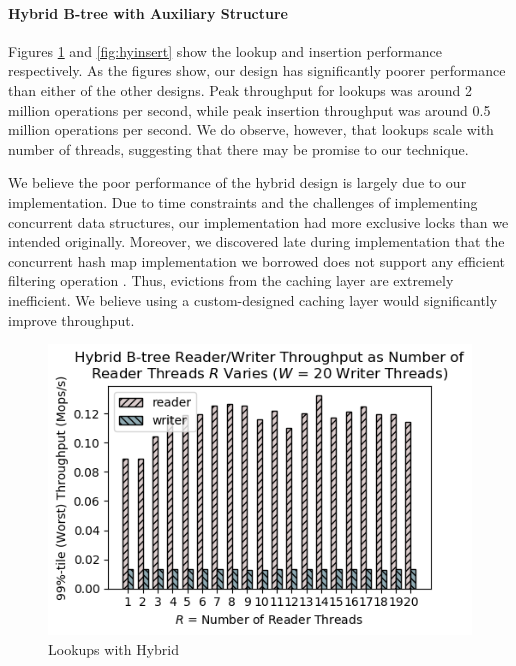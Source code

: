 \documentclass[twocolumn]{article}
\begin{document}
\paragraph{Hybrid B-tree with Auxiliary Structure}

Figures \ref{fig:hylookup} and \ref{fig:hyinsert} show the lookup and insertion
performance respectively. As the figures show, our design has significantly
poorer performance than either of the other designs. Peak throughput for
lookups was around 2 million operations per second, while peak insertion
throughput was around 0.5 million operations per second. We do observe,
however, that lookups scale with number of threads, suggesting that there may
be promise to our technique.

We believe the poor performance of the hybrid design is largely due to our
implementation. Due to time constraints and the challenges of implementing
concurrent data structures, our implementation had more exclusive locks than we
intended originally. Moreover, we discovered late during implementation that
the concurrent hash map implementation we borrowed does not support any
efficient filtering operation \cite{cuckoo}. Thus, evictions from the caching layer are
extremely inefficient. We believe using a custom-designed caching layer would
significantly improve throughput.

\begin{figure}[ht]
    \centering \includegraphics[width=\columnwidth]{figures/hybrid_w20_r1-20_99.png}
    \caption{Lookups with Hybrid \label{fig:hylookup}}
\end{figure}
\end{document}

